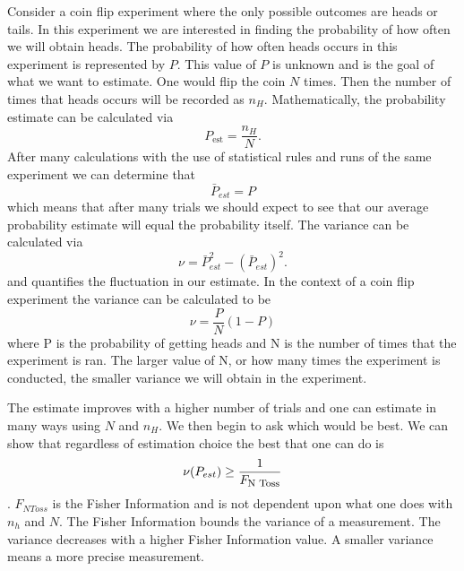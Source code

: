 \documentclass[twocolumn]{article}
\begin{document}
Consider a coin flip experiment where the only possible outcomes are heads or tails. In this experiment we are interested in finding the probability of how often we will obtain heads. The probability of how often heads occurs in this experiment is represented by $P$. This value of $P$ is unknown and is the goal of what we want to estimate. One would flip the coin $N$ times. Then the number of times that heads occurs will be recorded as $n_H$. Mathematically, the probability estimate can be calculated via
\begin{equation}\label{eq:47}
P_{\text{est}}=\frac{n_H}{N}.
\end{equation}
After many calculations with the use of statistical rules and runs of the same experiment we can determine that
\begin{equation} \label{eq:48}
\bar{P}_{est}=P
\end{equation}
which means that after many trials we should expect to see that our average probability estimate will equal the probability itself. The variance can be calculated via
\begin{equation} \label{eq:49}
\nu=\bar{P}^2_{est}-(\bar{P}_{est})^2.
\end{equation}
and quantifies the fluctuation in our estimate. In the context of a coin flip experiment the variance can be calculated to be
\begin{equation} \label{eq:50}
\nu=\frac{P}{N}(1-P)
\end{equation}
where P is the probability of getting heads and N is the number of times that the experiment is ran. The larger value of N, or how many times the experiment is conducted, the smaller variance we will obtain in the experiment. 

The estimate improves with a higher number of trials and one can estimate in many ways using $N$ and $n_H$. We then begin to ask which would be best. We can show that regardless of estimation choice the best that one can do is
\begin{equation} \label{eq:51}
\nu(P_{est})\geq\frac{1}{F_{\text{\footnotesize{N Toss}}}}
\end{equation}
\cite{D. Collins}. $F_{N Toss}$ is the Fisher Information and is not dependent upon what one does with $n_h$ and $N$. The Fisher Information bounds the variance of a measurement.  The variance decreases with a higher Fisher Information value. A smaller variance means a more precise measurement.
\end{document}
